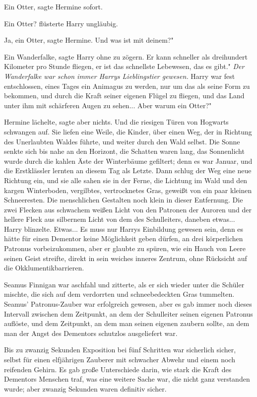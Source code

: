 \glqq Ein Otter\grqq{}, sagte Hermine sofort.

\glqq Ein Otter?\grqq{} flüsterte Harry ungläubig.

\glqq Ja, ein Otter\grqq{}, sagte Hermine. \glqq Und was ist mit deinem?"

\glqq Ein Wanderfalke\grqq{}, sagte Harry ohne zu zögern. \glqq Er kann
schneller als dreihundert Kilometer pro Stunde fliegen, er ist das schnellste
Lebewesen, das es gibt."
\emph{ Der Wanderfalke war schon immer Harrys Lieblingstier gewesen.}
Harry war fest entschlossen, eines Tages ein Animagus zu werden, nur um das als
seine Form zu bekommen, und durch die Kraft seiner eigenen Flügel zu fliegen,
und das Land unter ihm mit schärferen Augen zu sehen... \glqq Aber warum ein
Otter?"

Hermine lächelte, sagte aber nichts. Und die riesigen Türen von Hogwarts
schwangen auf. Sie liefen eine Weile, die Kinder, über einen Weg, der in
Richtung des Unerlaubten Waldes führte, und weiter durch den Wald selbst. Die
Sonne senkte sich bis nahe an den Horizont, die Schatten waren lang, das
Sonnenlicht wurde durch die kahlen Äste der Winterbäume gefiltert; denn es war
Januar, und die Erstklässler lernten an diesem Tag als Letzte. Dann schlug der
Weg eine neue Richtung ein, und sie alle sahen sie in der Ferne, die Lichtung im
Wald und den kargen Winterboden, vergilbtes, vertrocknetes Gras, geweißt von ein
paar kleinen Schneeresten. Die menschlichen Gestalten noch klein in dieser
Entfernung. Die zwei Flecken aus schwachem weißen Licht von den Patronen der
Auroren und der hellere Fleck aus silbernem Licht von dem des Schulleiters,
daneben etwas... Harry blinzelte. Etwas... Es muss nur Harrys Einbildung gewesen
sein, denn es hätte für einen Dementor keine Möglichkeit geben dürfen, an drei
körperlichen Patronus vorbeizukommen, aber er glaubte zu spüren, wie ein Hauch
von Leere seinen Geist streifte, direkt in sein weiches inneres Zentrum, ohne
Rücksicht auf die Okklumentikbarrieren.

Seamus Finnigan war aschfahl und zitterte, als er sich wieder unter die Schüler
mischte, die sich auf dem verdorrten und schneebedeckten Gras tummelten. Seamus'
Patronus-Zauber war erfolgreich gewesen, aber es gab immer noch dieses Intervall
zwischen dem Zeitpunkt, an dem der Schulleiter seinen eigenen Patronus auflöste,
und dem Zeitpunkt, an dem man seinen eigenen zaubern sollte, an dem man der
Angst des Dementors schutzlos ausgeliefert war.

Bis zu zwanzig Sekunden Exposition bei fünf Schritten war sicherlich sicher,
selbst für einen elfjährigen Zauberer mit schwacher Abwehr und einem noch
reifenden Gehirn. Es gab große Unterschiede darin, wie stark die Kraft des
Dementors Menschen traf, was eine weitere Sache war, die nicht ganz verstanden
wurde; aber zwanzig Sekunden waren definitiv sicher.

